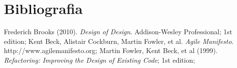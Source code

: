 \section{Bibliografia}

\begin{thebibliography}{12} 

 Frederich Brooks (2010). \textit{Design of Design}. Addison-Wesley Professional; 1st edition;
 Kent Beck, Alistair Cockburn, Martin Fowler, et al. \textit{Agile Manifesto}. http://www.agilemanifesto.org;
 Martin Fowler, Kent Beck, et al (1999). \textit{Refactoring: Improving the Design of Existing Code}; 1st edition;


\end{thebibliography}
